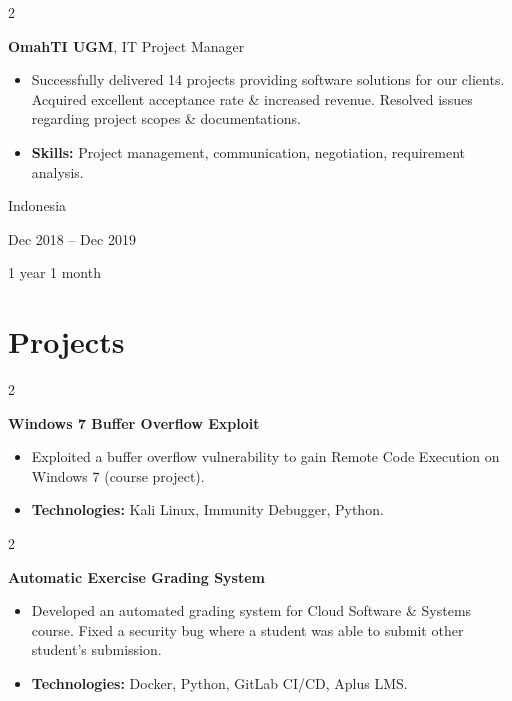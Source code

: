 \documentclass[10pt, a4paper]{article}
\newenvironment{highlights}{
    \begin{itemize}[
        topsep=0.10 cm,
        parsep=0.10 cm,
        partopsep=0pt,
        itemsep=0pt,
        leftmargin=0 cm + 10pt
    ]
}{
    \end{itemize}
} %
\newenvironment{twocolentry}[2][]{
    \onecolentry
    \def\secondColumn{#2}
    \setcolumnwidth{\fill, 3 cm}
    \begin{paracol}{2}
}{
    \switchcolumn \raggedleft \secondColumn
    \end{paracol}
    \endonecolentry
} %
\begin{document}
        \vspace{0.2 cm}

        \begin{twocolentry}{
            Indonesia

        Dec 2018 – Dec 2019

        1 year 1 month
        }
            \textbf{OmahTI UGM}, IT Project Manager
            \begin{highlights}
                \item Successfully delivered 14 projects providing software solutions for our clients. Acquired excellent acceptance rate \& increased revenue. Resolved issues regarding project scopes \& documentations.
                \item \textbf{Skills:} Project management, communication, negotiation, requirement analysis.
            \end{highlights}
        \end{twocolentry}



    
    \section{Projects}



        
        \begin{twocolentry}{
            2023
        }
            \textbf{Windows 7 Buffer Overflow Exploit}
            \begin{highlights}
                \item Exploited a buffer overflow vulnerability to gain Remote Code Execution on Windows 7 (course project).
                \item \textbf{Technologies:} Kali Linux, Immunity Debugger, Python.
            \end{highlights}
        \end{twocolentry}


        \vspace{0.2 cm}

        \begin{twocolentry}{
            2023
        }
            \textbf{Automatic Exercise Grading System}
            \begin{highlights}
                \item Developed an automated grading system for Cloud Software \& Systems course. Fixed a security bug where a student was able to submit other student's submission.
                \item \textbf{Technologies:} Docker, Python, GitLab CI/CD, Aplus LMS.
            \end{highlights}
        \end{twocolentry}
\end{document}
